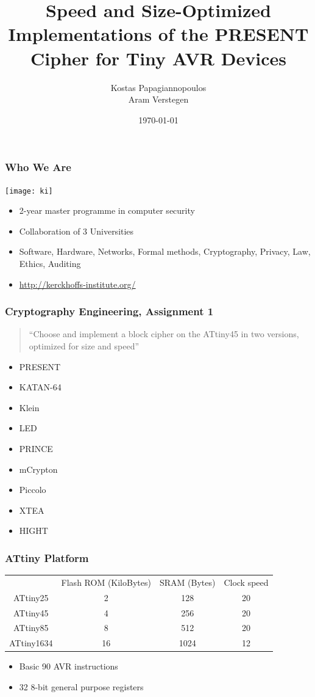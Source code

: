 \documentclass{beamer}
\title[Speed and Size-Optimized PRESENT for AVR]{Speed and Size-Optimized Implementations of the PRESENT Cipher for Tiny AVR Devices}
\author[Papagiannopoulos and Verstegen]{
Kostas Papagiannopoulos \\
Aram Verstegen
}
\date{\today}
\begin{document}
\frame{\titlepage}

\begin{frame}[fragile]
\frametitle{Who We Are}
\texttt{[image: ki]}
\begin{itemize}
\item 2-year master programme in computer security
\item Collaboration of 3 Universities
\item Software, Hardware, Networks, Formal methods, Cryptography, Privacy, Law, Ethics, Auditing
\item \url{http://kerckhoffs-institute.org/}
\end{itemize}
\end{frame}

\begin{frame}[fragile]
\frametitle{Cryptography Engineering, Assignment 1}
\begin{quote}
``Choose and implement a block cipher on the ATtiny45 in two versions, optimized for size and speed''
\end{quote}

\begin{itemize}
\item PRESENT
\item KATAN-64
\item Klein
\item LED
\item PRINCE
\item mCrypton
\item Piccolo
\item XTEA
\item HIGHT
\end{itemize}
\end{frame}

\begin{frame}[fragile]
\frametitle{ATtiny Platform}
\begin{tabular}{c c c c}
         & Flash ROM (KiloBytes) & SRAM (Bytes) & Clock speed \\
ATtiny25 & 2 & 128 & 20 \\
ATtiny45 & 4 & 256 & 20 \\
ATtiny85 & 8 & 512 & 20 \\
ATtiny1634 & 16 & 1024 & 12 \\
\end{tabular}
\begin{itemize}
\item Basic 90 AVR instructions
\item 32 8-bit general purpose registers
\end{itemize}
\end{frame}
\end{document}
